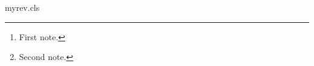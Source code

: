 \begin{filecontents}[force]{myrev.cls}
\let\my@thanks\@empty
\renewcommand\maketitle{\begingroup\renewcommand\thefootnote{\arabic{footnote}}%
 \def\thanks##1{\footnotemark\protected@xdef\my@thanks{\my@thanks\protect\footnotetext[\the\c@footnote]{##1}}}%
 \begin{center}\@myauthor\end{center}\my@thanks\endgroup}
\renewcommand\author[1]{\gdef\@myauthor{#1}}
\end{filecontents}
\documentclass{myrev}
\author{Ann Able\thanks{First note.} and Bob Baker\thanks{Second note.}}

\maketitle
Body.

